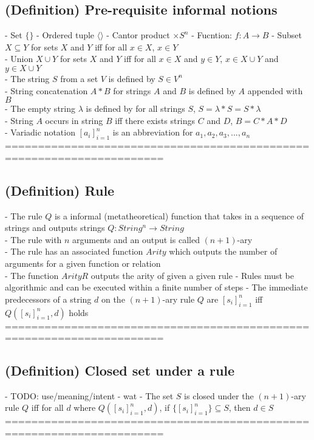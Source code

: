\documentclass{article}
\begin{document}
\subsection{(Definition) Pre-requisite informal notions}
	- Set $\{ \}$
	- Ordered tuple $\langle \rangle$
	- Cantor product $\times S^n$
	- Fucntion: $f: A \rightarrow B$
	- Subset $X \subseteq Y$ for sets $X$ and $Y$ iff for all $x \in X$, $x \in Y$ \\
	- Union $X \cup Y$ for sets $X$ and $Y$ iff for all $x \in X$ and $y \in Y$, $x \in X \cup Y$ and $y \in X \cup Y$ \\
	- The string $S$ from a set $V$ is defined by $S \in V^n$ \\
	- String concatenation $A * B$ for strings $A$ and $B$ is defined by $A$ appended with $B$ \\
	- The empty string $\lambda$ is defined by for all strings $S$, $S = \lambda * S = S * \lambda$ \\
	- String $A$ occurs in string $B$ iff there exists strings $C$ and $D$, $B = C * A * D$ \\
	- Variadic notation $[a_i]_{i=1}^n$ is an abbreviation for $a_1, a_2, a_3, ..., a_n$ \\
	======================================================================
\subsection{(Definition) Rule}
	- The rule $Q$ is a informal (metatheoretical) function that takes in a sequence of strings and outputs strings $Q: String^n \rightarrow String$ \\
	- The rule with $n$ arguments and an output is called $(n+1)$-ary \\
	- The rule has an associated function $Arity$ which outputs the number of arguments for a given function or relation \\
	- The function $ArityR$ outputs the arity of given a given rule
	- Rules must be algorithmic and can be executed within a finite number of steps
	- The immediate predecessors of a string $d$ on the $(n+1)$-ary rule $Q$ are $[s_i]_{i=1}^n$ iff $Q([s_i]_{i=1}^n, d)$ holds
	======================================================================
\subsection{(Definition) Closed set under a rule}
	- TODO: use/meaning/intent - wat
	- The set $S$ is closed under the $(n+1)$-ary rule $Q$ iff for all $d$ where $Q([s_i]_{i=1}^n, d)$, if $\{[s_i]_{i=1}^n\} \subseteq S$, then $d \in S$ \\
	======================================================================
\end{document}
